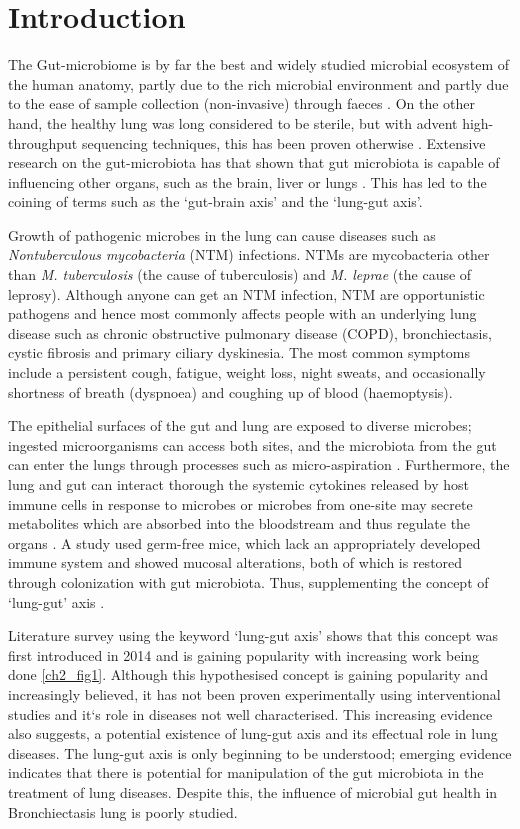 \section{Introduction}

The Gut-microbiome is by far the best and widely studied microbial ecosystem of the human anatomy, partly due to the rich microbial environment and partly due to the ease of sample collection (non-invasive) through faeces \cite{Budden2017}. On the other hand, the healthy lung was long considered to be sterile, but with advent high-throughput sequencing techniques, this has been proven otherwise \cite{Barker2002}. Extensive research on the gut-microbiota has that shown that gut microbiota is capable of influencing other organs, such as the brain, liver or lungs \cite{Bell2019}. This has led to the coining of terms such as the `gut-brain axis' and the `lung-gut axis'. 

Growth of pathogenic microbes in the lung can cause diseases such as \emph{Nontuberculous mycobacteria} (NTM) infections. NTMs are mycobacteria other than \emph{M. tuberculosis} (the cause of tuberculosis) and \emph{M. leprae} (the cause of leprosy). Although anyone can get an NTM infection, NTM are opportunistic pathogens and hence most commonly affects people with an underlying lung disease such as chronic obstructive pulmonary disease (COPD), bronchiectasis, cystic fibrosis and primary ciliary dyskinesia. The most common symptoms include a persistent cough, fatigue, weight loss, night sweats, and occasionally shortness of breath (dyspnoea) and coughing up of blood (haemoptysis)\cite{Ratnatunga2020}.

The epithelial surfaces of the gut and lung are exposed to diverse microbes; ingested microorganisms can access both sites, and the microbiota from the gut can enter the lungs through processes such as micro-aspiration \cite{Budden2017}. Furthermore, the lung and gut can interact thorough the systemic cytokines released by host immune cells in response to microbes or microbes from one-site may secrete metabolites which are absorbed into the bloodstream and thus regulate the organs \cite{Dang2019}. A study used germ-free mice, which lack an appropriately developed immune system and showed mucosal alterations, both of which is restored through colonization with gut microbiota. Thus, supplementing the concept of `lung-gut' axis \cite{Budden2017}.

Literature survey using the keyword `lung-gut axis' shows that this concept was first introduced in 2014 and is gaining popularity with increasing work being done \ref{ch2_fig1}. Although this hypothesised concept is gaining popularity and increasingly believed, it has not been proven experimentally using interventional studies and it`s role in diseases not well characterised. This increasing evidence also suggests, a potential existence of lung-gut axis and its effectual role in lung diseases. The lung-gut axis is only beginning to be understood; emerging evidence indicates that there is potential for manipulation of the gut microbiota in the treatment of lung diseases. Despite this, the influence of microbial gut health in Bronchiectasis lung is poorly studied. 

